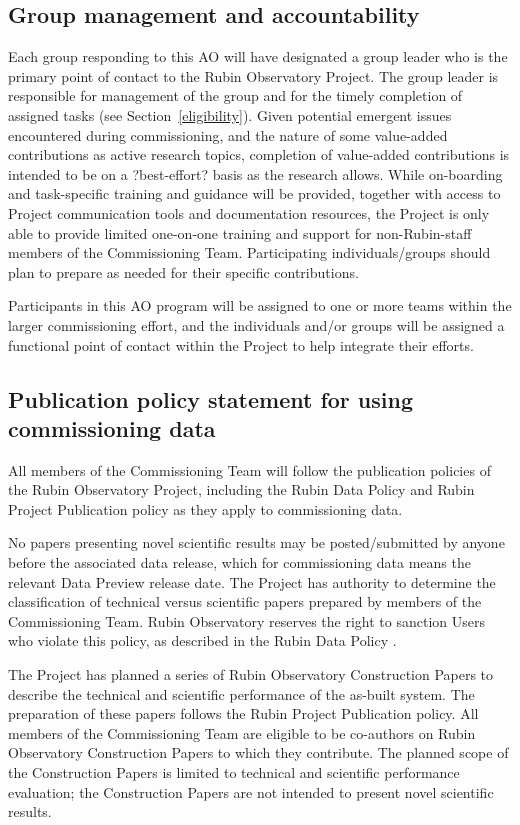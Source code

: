 \documentclass[SE,authoryear,toc,lsstdraft]{lsstdoc}
\begin{document}
\subsection{Group management and accountability}

Each group responding to this AO will have designated a group leader who is the primary point of contact to the Rubin Observatory Project. The group leader is responsible for management of the group and for the timely completion of assigned tasks (see Section~\ref{eligibility}). Given potential emergent issues encountered during commissioning, and the nature of some value-added contributions as active research topics, completion of value-added contributions is intended to be on a ?best-effort? basis as the research allows. While on-boarding and task-specific training and guidance will be provided, together with access to Project communication tools and documentation resources, the Project is only able to provide limited one-on-one training and support for non-Rubin-staff members of the Commissioning Team. Participating individuals/groups should plan to prepare as needed for their specific contributions.

Participants in this AO program will be assigned to one or more teams within the larger commissioning effort, and the individuals and/or groups will be assigned a functional point of contact within the Project to help integrate their efforts.

\subsection{Publication policy statement for using commissioning data}
\label{publications}

All members of the Commissioning Team will follow the publication policies of the Rubin Observatory Project, including the Rubin Data Policy  and Rubin Project Publication policy  as they apply to commissioning data.

No papers presenting novel scientific results may be posted/submitted by anyone before the associated data release, which for commissioning data means the relevant Data Preview release date. The Project has authority to determine the classification of technical versus scientific papers prepared by members of the Commissioning Team. Rubin Observatory reserves the right to sanction Users who violate this policy, as described in the Rubin Data Policy . 

The Project has planned a series of Rubin Observatory Construction Papers to describe the technical and scientific performance of the as-built system. The preparation of these papers follows the Rubin Project Publication policy. All members of the Commissioning Team are eligible to be co-authors on Rubin Observatory Construction Papers to which they contribute. The planned scope of the Construction Papers is limited to technical and scientific performance evaluation; the Construction Papers are not intended to present novel scientific results.
\end{document}
